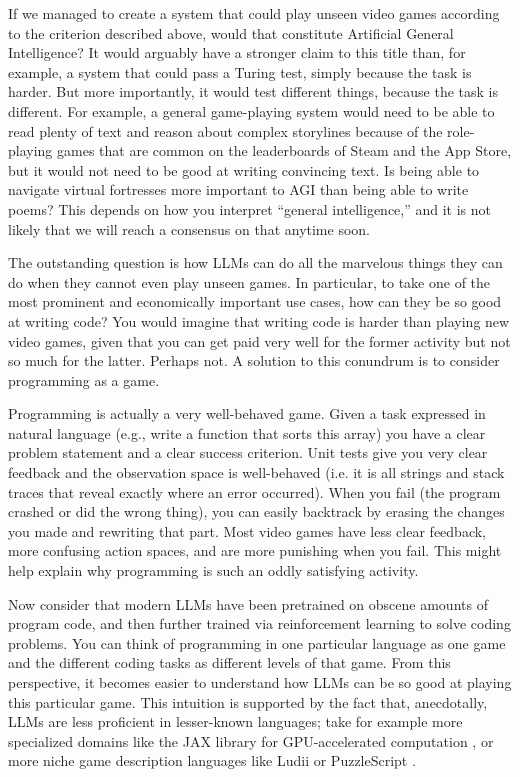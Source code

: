 \documentclass[runningheads]{llncs}
\begin{document}
If we managed to create a system that could play unseen video games according to the criterion described above, would that constitute Artificial General Intelligence? It would arguably have a stronger claim to this title than, for example, a system that could pass a Turing test, simply because the task is harder. But more importantly, it would test different things, because the task is different. For example, a general game-playing system would need to be able to read plenty of text and reason about complex storylines because of the role-playing games that are common on the leaderboards of Steam and the App Store, but it would not need to be good at writing convincing text. Is being able to navigate virtual fortresses more important to AGI than being able to write poems? This depends on how you interpret ``general intelligence,'' and it is not likely that we will reach a consensus on that anytime soon.

The outstanding question is how LLMs can do all the marvelous things they can do when they cannot even play unseen games. In particular, to take one of the most prominent and economically important use cases, how can they be so good at writing code? You would imagine that writing code is harder than playing new video games, given that you can get paid very well for the former activity but not so much for the latter. Perhaps not. A solution to this conundrum is to consider programming as a game.

Programming is actually a very well-behaved game. Given a task expressed in natural language (e.g., write a function that sorts this array) you have a clear problem statement and a clear success criterion. Unit tests give you very clear feedback
and the observation space is well-behaved (i.e. it is all strings and stack traces that reveal exactly where an error occurred). When you fail (the program crashed or did the wrong thing), you can easily backtrack by erasing the changes you made and rewriting that part. Most video games have less clear feedback, more confusing action spaces, and are more punishing when you fail. This might help explain why programming is such an oddly satisfying activity.

Now consider that modern LLMs have been pretrained on obscene amounts of program code, and then further trained via reinforcement learning to solve coding problems. You can think of programming in one particular language as one game and the different coding tasks as different levels of that game. From this perspective, it becomes easier to understand how LLMs can be so good at playing this particular game. This intuition is supported by the fact that, anecdotally, LLMs are less proficient in lesser-known languages; take for example more specialized domains like the JAX library for GPU-accelerated computation \cite{jax2018github}, or more niche game description languages like Ludii \cite{stephenson2019overview} or PuzzleScript \cite{lavelle2016puzzlescript}.
\end{document}
